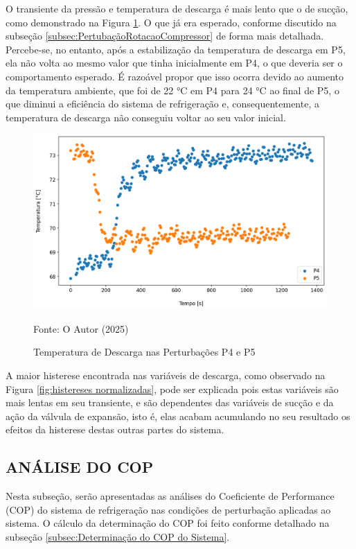O transiente da pressão e temperatura de descarga é mais lento que o de sucção, como demonstrado na Figura \ref{fig:TempDescargaSubidaeDescida}. O que já era esperado, conforme discutido na subseção \ref{subsec:PertubaçãoRotacaoCompressor} de forma mais detalhada.
Percebe-se, no entanto, após a estabilização da temperatura de descarga em P5, ela não volta ao mesmo valor que tinha inicialmente em P4, o que deveria ser o comportamento esperado. É razoável propor que isso ocorra devido ao aumento da temperatura ambiente, que foi de 22 °C em P4 para 24 °C ao final de P5, o que diminui a eficiência do sistema de refrigeração e, consequentemente, a temperatura de descarga não conseguiu voltar ao seu valor inicial.
\newpage
\begin{figure}[h]
    \centering
    \includegraphics[width=1\linewidth]{FigurasdoTexto/Temperatura de Descarga.png}
    \caption{Temperatura de Descarga  nas Perturbações P4 e P5}
    \label{fig:TempDescargaSubidaeDescida}
    {\footnotesize Fonte: O Autor (2025)}
\end{figure}

A maior histerese encontrada nas variáveis de descarga, como observado na Figura \ref{fig:histereses normalizadas}, pode ser explicada pois estas variáveis são mais lentas em seu transiente, e são dependentes das variáveis de sucção e da ação da válvula de expansão, isto é, elas acabam acumulando no seu resultado os efeitos da histerese destas outras partes do sistema. 

\subsection{\MakeUppercase{Análise do COP}}

Nesta subseção, serão apresentadas as análises do Coeficiente de Performance (COP) do sistema de refrigeração nas condições de perturbação aplicadas ao sistema. O cálculo da determinação do COP foi feito conforme detalhado na subseção \ref{subsec:Determinação do COP do Sistema}.

